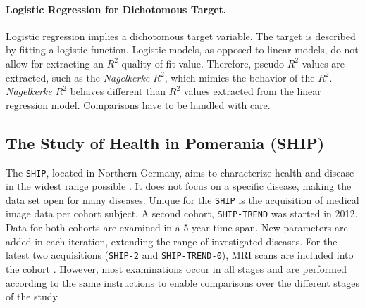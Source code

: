 \documentclass[journal]{style/vgtc} 			          %
\newcommand{\com}[1]{\textcolor{orange}{\uline{#1}}}
\begin{document}
\paragraph{Logistic Regression for Dichotomous Target.} Logistic regression implies a dichotomous target variable.
The target is described by fitting a logistic function.
Logistic models, as opposed to linear models, do not allow for extracting an $R^2$ quality of fit value.
Therefore, pseudo-$R^2$ values are extracted, such as the \emph{Nagelkerke $R^2$}, which mimics the behavior of the $R^2$.
\emph{Nagelkerke $R^2$} behaves different than $R^2$ values extracted from the linear regression model.
Comparisons have to be handled with care.


\subsection{The Study of Health in Pomerania (SHIP)}
The \texttt{SHIP}, located in Northern Germany, aims to characterize health and disease in the widest range possible \cite{Volzke2011}.
It does not focus on a specific disease, making the data set open for many diseases.
Unique for the \texttt{SHIP} is the acquisition of medical image data per cohort subject.
A second cohort, \texttt{SHIP-TREND} was started in 2012.
Data for both cohorts are examined in a 5-year time span.
New parameters are added in each iteration, extending the range of investigated diseases.
For the latest two acquisitions (\texttt{SHIP-2} and \texttt{SHIP-TREND-0}), MRI scans are included into the cohort \cite{Hegenscheid2009, Ivanovska2014}.
However, most examinations occur in all stages and are performed according to the same instructions to enable comparisons over the different stages of the study. %
%
%
%
%
%
%
\end{document}
